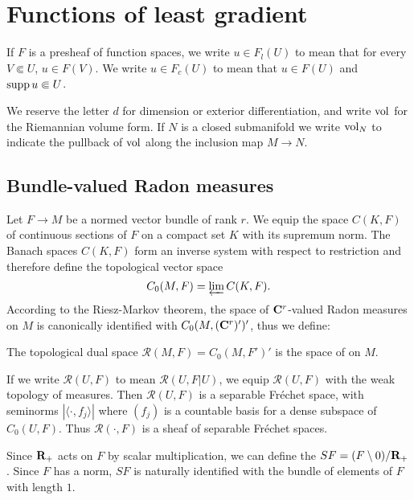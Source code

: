 \section{Functions of least gradient}\label{LeastGradientFunctions}
\begin{notation}[presheaves]
If $F$ is a presheaf of function spaces, we write $u \in F_l(U)$ to mean that for every $V \Subset U$, $u \in F(V)$.
We write $u \in F_c(U)$ to mean that $u \in F(U)$ and $\operatorname{supp} u \Subset U$.
\end{notation}

\begin{notation}
We reserve the letter $d$ for dimension or exterior differentiation, and write $\mathrm{vol}$ for the Riemannian volume form.
If $N$ is a closed submanifold we write $\mathrm{vol}_N$ to indicate the pullback of $\mathrm{vol}$ along the inclusion map $M \to N$.
\end{notation}


\subsection{Bundle-valued Radon measures}
Let $F \to M$ be a normed vector bundle of rank $r$.
We equip the space $C(K, F)$ of continuous sections of $F$ on a compact set $K$ with its supremum norm.
The Banach spaces $C(K, F)$ form an inverse system with respect to restriction and therefore define the topological vector space
$$C_0(M, F) = \varprojlim C(K, F).$$
According to the Riesz-Markov theorem, the space of $\mathbf{C}^r$-valued Radon measures on $M$ is canonically identified with $C_0(M, (\mathbf{C}^r)')'$, thus we define:

\begin{definition}
The topological dual space $\mathcal R(M, F) = C_0(M, F')'$ is the space of  on $M$.
\end{definition}

If we write $\mathcal R(U, F)$ to mean $\mathcal R(U, F|U)$, we equip $\mathcal R(U, F)$ with the weak topology of measures.
Then $\mathcal R(U, F)$ is a separable Fr\'echet space, with seminorms $|\langle \cdot, f_j\rangle|$ where $(f_j)$ is a countable basis for a dense subspace of $C_0(U, F)$.
Thus $\mathcal R(\cdot, F)$ is a sheaf of separable Fr\'echet spaces.

Since $\mathbf{R}_+$ acts on $F$ by scalar multiplication, we can define the  $SF = (F \setminus 0)/\mathbf{R}_+$.
Since $F$ has a norm, $SF$ is naturally identified with the bundle of elements of $F$ with length $1$.


